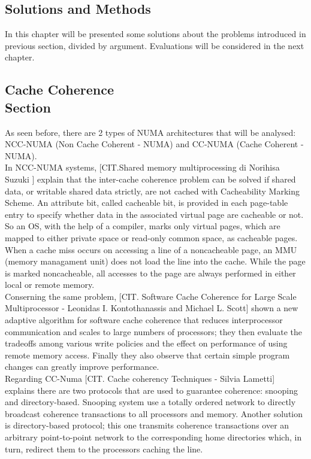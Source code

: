 \documentclass[a4paper,10pt]{article}
\begin{document}
\begin{multicols}{2}
\section{Solutions and Methods}

In this chapter will be presented some solutions about the problems introduced in previous section, divided by argument. Evaluations will be considered in the next chapter.

\subsection{Cache Coherence \\ Section}

As seen before, there are 2 types of NUMA architectures that will be analysed: NCC-NUMA (Non Cache Coherent - NUMA) and CC-NUMA (Cache Coherent - NUMA). \\
In NCC-NUMA systems, [CIT.Shared memory multiprocessing di Norihisa Suzuki ] explain that the inter-cache coherence problem can be solved if shared data, or writable shared data strictly, are not cached with Cacheability Marking Scheme. An attribute bit, called cacheable bit, is provided in each page-table entry to specify whether data in the associated virtual page are cacheable or not. So an OS, with the help of a compiler, marks only virtual pages, which are mapped to either private space or read-only common space, as cacheable pages. When a cache miss occurs on accessing a line of a noncacheable page, an MMU (memory managament unit) does not load the line into the cache. While the page is marked noncacheable, all accesses to the page are always performed in either local or remote memory.\\
Conserning the same problem, [CIT. Software Cache Coherence for Large Scale Multiprocessor - Leonidas I. Kontothanassis and Michael L. Scott] shown a new adaptive algorithm for software cache coherence that reduces interprocessor communication and scales to large numbers of processors; they then evaluate the tradeoffs among various write policies and the effect on performance of using remote memory access. Finally they also observe that certain simple program changes can greatly improve performance.\\
Regarding CC-Numa [CIT. Cache coherency Techniques - Silvia Lametti] explains there are two protocols that are used to guarantee coherence: snooping and directory-based. Snooping system use a totally ordered network to directly broadcast coherence transactions to all processors and memory. Another solution is directory-based protocol; this one transmits coherence transactions over an arbitrary point-to-point network to the corresponding home directories which, in turn, redirect them to the processors caching the line. 


\end{multicols}
\end{document}
